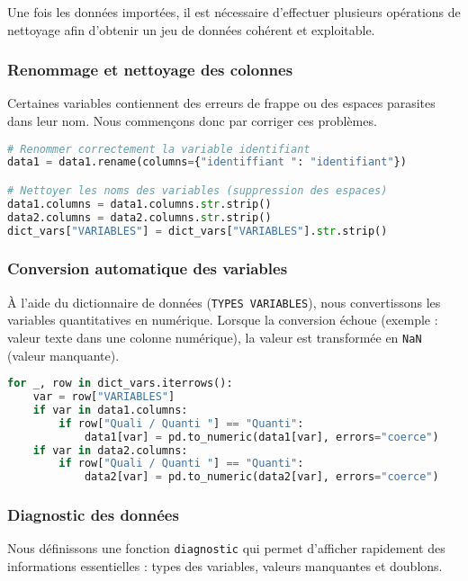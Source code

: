 Une fois les données importées, il est nécessaire d'effectuer plusieurs opérations de nettoyage afin d'obtenir un jeu de données cohérent et exploitable.

\subsubsection{Renommage et nettoyage des colonnes}
Certaines variables contiennent des erreurs de frappe ou des espaces parasites dans leur nom. Nous commençons donc par corriger ces problèmes.

\begin{lstlisting}[language=Python, caption=Correction des noms de variables]
# Renommer correctement la variable identifiant
data1 = data1.rename(columns={"identiffiant ": "identifiant"})

# Nettoyer les noms des variables (suppression des espaces)
data1.columns = data1.columns.str.strip()
data2.columns = data2.columns.str.strip()
dict_vars["VARIABLES"] = dict_vars["VARIABLES"].str.strip()
\end{lstlisting}

\subsubsection{Conversion automatique des variables}
À l’aide du dictionnaire de données (\texttt{TYPES VARIABLES}), nous convertissons les variables quantitatives en numérique.  
Lorsque la conversion échoue (exemple : valeur texte dans une colonne numérique), la valeur est transformée en \texttt{NaN} (valeur manquante).

\begin{lstlisting}[language=Python, caption=Conversion des variables selon le dictionnaire]
for _, row in dict_vars.iterrows():
    var = row["VARIABLES"]
    if var in data1.columns:
        if row["Quali / Quanti "] == "Quanti":
            data1[var] = pd.to_numeric(data1[var], errors="coerce")
    if var in data2.columns:
        if row["Quali / Quanti "] == "Quanti":
            data2[var] = pd.to_numeric(data2[var], errors="coerce")
\end{lstlisting}

\subsubsection{Diagnostic des données}
Nous définissons une fonction \texttt{diagnostic} qui permet d'afficher rapidement des informations essentielles :  
types des variables, valeurs manquantes et doublons.

